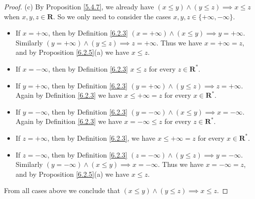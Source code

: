 \begin{proof}{(c)}
      By Proposition \ref{5.4.7}, we already have \((x \leq y) \land (y \leq z) \implies x \leq z\) when \(x, y, z \in \mathbf{R}\).
      So we only need to consider the cases \(x, y, z \in \{+\infty, -\infty\}\).
      \begin{itemize}
            \item If \(x = +\infty\), then by Definition \ref{6.2.3} \((x = +\infty) \land (x \leq y) \implies y = +\infty\).
                  Similarly \((y = +\infty) \land (y \leq z) \implies z = +\infty\).
                  Thus we have \(x = +\infty = z\), and by Proposition \ref{6.2.5}(a) we have \(x \leq z\).
            \item If \(x = -\infty\), then by Definition \ref{6.2.3} \(x \leq z \) for every \(z \in \mathbf{R}^*\).
            \item If \(y = +\infty\), then by Definition \ref{6.2.3} \((y = +\infty) \land (y \leq z) \implies z = +\infty\).
                  Again by Definition \ref{6.2.3} we have \(x \leq +\infty = z\) for every \(x \in \mathbf{R}^*\).
            \item If \(y = -\infty\), then by Definition \ref{6.2.3} \((y = -\infty) \land (x \leq y) \implies x = -\infty\).
                  Again by Definition \ref{6.2.3} we have \(x = -\infty \leq z\) for every \(z \in \mathbf{R}^*\).
            \item If \(z = +\infty\), then by Definition \ref{6.2.3}, we have \(x \leq +\infty = z\) for every \(x \in \mathbf{R}^*\).
            \item If \(z = -\infty\), then by Definition \ref{6.2.3} \((z = -\infty) \land (y \leq z) \implies y = -\infty\).
                  Similarly \((y = -\infty) \land (x \leq y) \implies x = -\infty\).
                  Thus we have \(x = -\infty = z\), and by Proposition \ref{6.2.5}(a) we have \(x \leq z\).
      \end{itemize}
      From all cases above we conclude that \((x \leq y) \land (y \leq z) \implies x \leq z\).
\end{proof}

